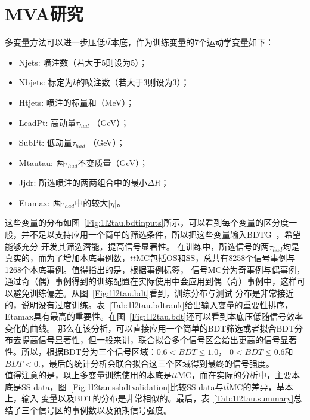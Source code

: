 \section{MVA研究}
多变量方法可以进一步压低$t\bar{t}$本底，作为训练变量的7个运动学变量如下：
\begin{itemize}
 \item Njets: 喷注数（若大于5则设为5）；
 \item Nbjets: 标定为$b$的喷注数（若大于3则设为3）；
 \item Htjets: 喷注\pt 的标量和（MeV）；
 \item LeadPt: 高动量$\tau_{had}$ \pt （GeV）；
 \item SubPt: 低动量$\tau_{had}$ \pt （GeV）；
 \item Mtautau: 两$\tau_{had}$不变质量（GeV）；
 \item Jjdr: 所选喷注的两两组合中的最小$\Delta R$；
 \item Etamax: 两$\tau_{had}$中的较大$|\eta|$。
\end{itemize}
这些变量的分布如图~\ref{Fig:1l2tau.bdtinputs}所示，可以看到每个变量的区分度一般，并不足以支持应用一个简单的筛选条件，所以把这些变量输入BDTG~\cite{}，希望能够充分
开发其筛选潜能，提高信号显著性。
在训练中，所选信号的两$\tau_{had}$均是真实的，而为了增加本底事例数，$t\bar{t}$MC包括OS和SS，总共有8258个信号事例与1268个本底事例。值得指出的是，根据事例标签，
信号MC分为奇事例与偶事例，通过奇（偶）事例得到的训练配置在实际使用中会应用到偶（奇）事例中，这样可以避免训练偏差。从图~\ref{Fig:1l2tau.bdt}看到，训练分布与测试
分布是非常接近的，说明没有过度训练。表~\ref{Tab:1l2tau.bdtrank}给出输入变量的重要性排序，Etamax具有最高的重要性。在图~\ref{Fig:1l2tau.bdt}还可以看到本底压低随信号效率变化的曲线。
那么在该分析，可以直接应用一个简单的BDT筛选或者拟合BDT分布去提高信号显著性，但一般来讲，联合拟合多个信号区会给出更高的信号显著性。所以，根据BDT分为三个信号区域：$0.6<BDT\le 1.0$，
$0<BDT\le 0.6$和$BDT<0.$，最后的统计分析会联合拟合这三个区域得到最终的信号强度。\\
值得注意的是，以上多变量训练使用的本底是$t\bar{t}$MC，而在实际的分析中，主要本底是SS data，图~\ref{Fig:1l2tau.ssbdtvalidation}比较SS data与$t\bar{t}$MC的差异，基本上，输入
变量以及BDT的分布是非常相似的。最后，表~\ref{Tab:1l2tau.summary}总结了三个信号区的事例数以及预期信号强度。
